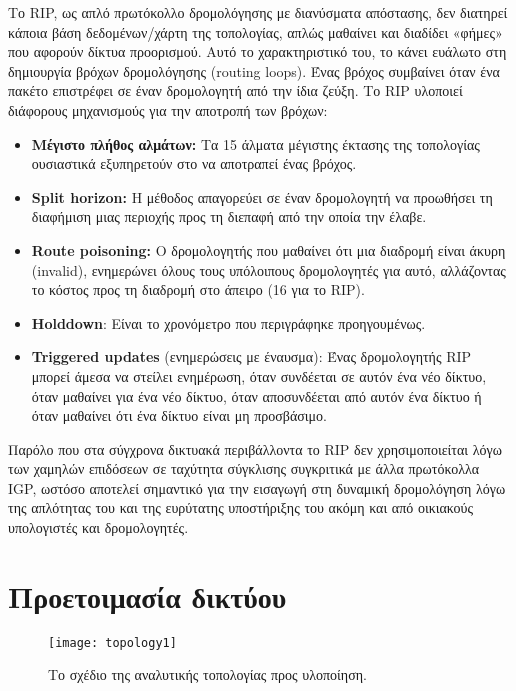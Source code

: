 \documentclass{EdipyLabs} %
\begin{document}
Το RIP, ως απλό πρωτόκολλο δρομολόγησης με διανύσματα απόστασης, δεν διατηρεί κάποια βάση δεδομένων/χάρτη της τοπολογίας, απλώς μαθαίνει και διαδίδει «φήμες» που αφορούν δίκτυα προορισμού. Αυτό το χαρακτηριστικό του, το κάνει ευάλωτο στη δημιουργία βρόχων δρομολόγησης (routing loops). Ένας βρόχος συμβαίνει όταν ένα πακέτο επιστρέφει σε έναν δρομολογητή από την ίδια ζεύξη. Το RIP υλοποιεί διάφορους μηχανισμούς για την αποτροπή των βρόχων:

\begin{itemize}
	\item \textbf{Μέγιστο πλήθος αλμάτων:} Τα 15 άλματα μέγιστης έκτασης της τοπολογίας ουσιαστικά εξυπηρετούν στο να αποτραπεί ένας βρόχος.
	\item \textbf{Split horizon:} Η μέθοδος απαγορεύει σε έναν δρομολογητή να προωθήσει τη διαφήμιση μιας περιοχής προς τη διεπαφή από την οποία την έλαβε.
	\item  \textbf{Route poisoning:} Ο δρομολογητής που μαθαίνει ότι μια διαδρομή είναι άκυρη (invalid), ενημερώνει όλους τους υπόλοιπους δρομολογητές για αυτό, αλλάζοντας το κόστος προς τη διαδρομή στο άπειρο (16 για το RIP).
	\item \textbf{Holddown}: Είναι το χρονόμετρο που περιγράφηκε προηγουμένως.
	\item \textbf{Triggered updates} (ενημερώσεις με έναυσμα): Ένας δρομολογητής RIP μπορεί άμεσα να στείλει ενημέρωση, όταν συνδέεται σε αυτόν ένα νέο δίκτυο, όταν μαθαίνει για ένα νέο δίκτυο, όταν αποσυνδέεται από αυτόν ένα δίκτυο ή όταν μαθαίνει ότι ένα δίκτυο είναι μη προσβάσιμο.
\end{itemize}

Παρόλο που στα σύγχρονα δικτυακά περιβάλλοντα το RIP δεν χρησιμοποιείται λόγω των χαμηλών επιδόσεων σε ταχύτητα σύγκλισης συγκριτικά με άλλα πρωτόκολλα IGP, ωστόσο αποτελεί σημαντικό για την εισαγωγή στη δυναμική δρομολόγηση λόγω της απλότητας του και της ευρύτατης υποστήριξης του ακόμη και από οικιακούς υπολογιστές και δρομολογητές.

\newpage

\section{Προετοιμασία δικτύου}

\begin{figure}[H]
	\centering
	\texttt{[image: topology1]}
	\caption{Το σχέδιο της αναλυτικής τοπολογίας προς υλοποίηση.}\label{fig:topology1}
\end{figure}
\end{document}
